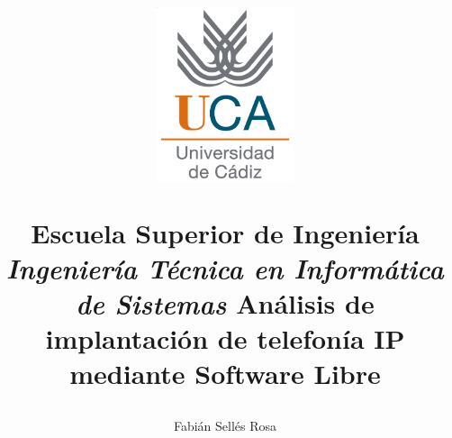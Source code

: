 \documentclass{scrbook}
\author{Fabián Sellés Rosa}
\title{\begin{center} \includegraphics[width=0.3\textwidth]{images/logouca} \end{center} \vfill{} \textbf{\huge{Escuela Superior de Ingeniería}} \vfill{} \textit{Ingeniería Técnica en Informática de Sistemas} \vfill{} Análisis de implantación de telefonía IP mediante Software Libre \\ }
\date{}
\begin{document}
\newcommand{\parrafo}[1]{\vspace{20pt}\underline{\textbf{#1}}}

\maketitle


\tableofcontents{}
\listoffigures{}



\appendix







\end{document}
